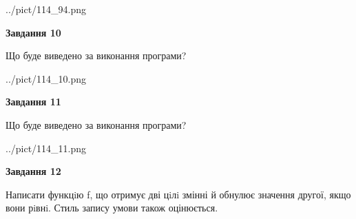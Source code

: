 \documentclass[12pt, ukrainian]{article}
\begin{document}
{\begin {large}
\begin{center}
	{../pict/114_94.png}
\end{center}
\newpage

{\begin {center}\textbf{Завдання 10}\end {center}}

Що буде виведено за виконання програми?\par
\begin{center}
	{../pict/114_10.png}
\end{center}
\newpage

{\begin {center}\textbf{Завдання 11}\end {center}}

Що буде виведено за виконання програми?\par
\begin{center}
	{../pict/114_11.png}
\end{center}
\newpage

{\begin {center}\textbf{Завдання 12}\end {center}}


Написати функцiю f, що отримує дві цiлi змінні й обнулює значення другої, якщо вони рiвнi. Стиль запису умови також оцінюється.\par
\newpage

\end {large}}
\end{document}
